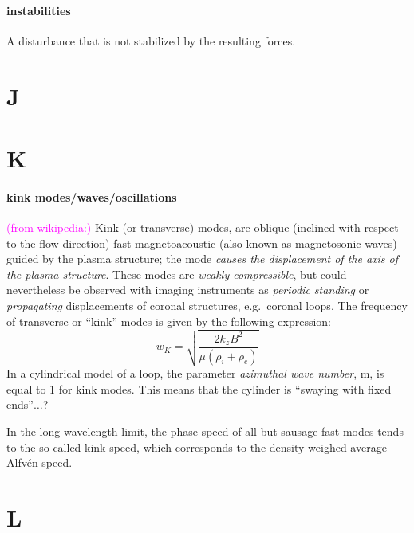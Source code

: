 \documentclass[12pt]{article}
\begin{document}
\paragraph{instabilities}
A disturbance that is not stabilized by the resulting forces.

\section*{J}
\section*{K}

\paragraph{kink modes/waves/oscillations}
\textcolor{magenta}{(from wikipedia:)}
Kink (or transverse) modes,
are oblique (inclined with respect to the flow direction)
fast magnetoacoustic
(also known as magnetosonic waves) guided by the plasma structure;
the mode \emph{causes the displacement of the axis of the plasma structure}.
These modes are \emph{weakly compressible}, but could nevertheless be
observed with imaging instruments as \emph{periodic standing}
or \emph{propagating} displacements of coronal structures, e.g.\ coronal loops.
The frequency of transverse or ``kink'' modes is given by the following expression:
    $$ w_K = \sqrt{ \frac{2k_zB^2}{\mu(\rho_i+\rho_e)}  }   $$
In a cylindrical model of a loop,
the parameter \emph{azimuthal wave number},
m, is equal to 1 for kink modes.
This means that the cylinder is ``swaying with fixed ends''$\ldots$?

In the long wavelength limit, the phase speed of all but
sausage fast modes tends to the so-called kink speed,
which corresponds to the density weighed average Alfv\'en speed.

\section*{L}
\end{document}

